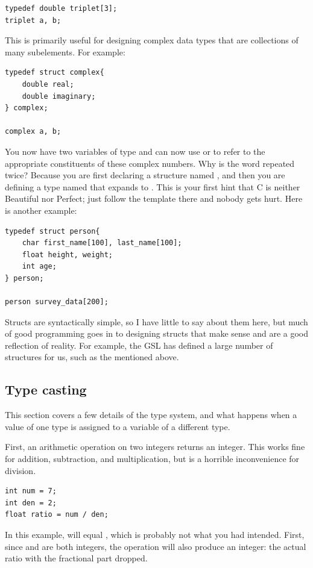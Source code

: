 \documentclass[12pt]{article}
\makeatletter
\def\cindex#1{\index{#1@\cinline{#1}}}
\makeatother
\begin{document}
\begin{lstlisting}
typedef double triplet[3];
triplet	a, b;
\end{lstlisting}

This is primarily useful for designing
complex data types that are collections of many subelements. \cindex{struct}
For example:

\begin{lstlisting}
typedef struct complex{
    double real;
    double imaginary;
} complex;

complex a, b;
\end{lstlisting}

You now have two variables of type  and can now use  or  to refer to the appropriate constituents
of these complex numbers. Why is the word  repeated
twice? Because you are first declaring a structure named ,
and then you are defining a type named  that expands to
. This is your first hint that C is neither Beautiful
nor Perfect; just follow the template there and nobody gets hurt. Here is
another example:
\begin{lstlisting}
typedef struct person{
    char first_name[100], last_name[100];
    float height, weight;
    int age;
} person;

person survey_data[200];
\end{lstlisting}

Structs are syntactically simple, so I have little to say about them here,
but much of good programming goes in to designing structs that make sense
and are a good reflection of reality.  For example, the GSL has defined
a large number of structures for us, such as the 
mentioned above.


\subsection{\treesymbol Type casting}\label{casting}   
This section covers a few details of the type system, and what happens
when a value of one type is assigned to a variable of a different type.

First, an arithmetic operation on two integers returns an integer. This works fine for
addition, subtraction, and multiplication, but is a horrible inconvenience for division.\\
\begin{lstlisting}
int num = 7;
int den = 2;
float ratio = num / den;
\end{lstlisting}
In this example,  will equal , which is probably not what you had intended. 
First, since  and  are both integers, the operation
 will also produce an integer: the actual ratio with the
fractional part dropped.
\end{document}
